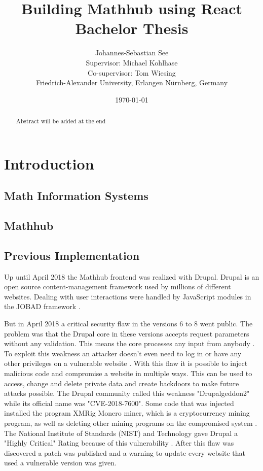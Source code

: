 \documentclass[11pt,a4paper]{article}
\title{Building Mathhub using React\\ \vspace{2 mm} Bachelor Thesis}
\author{Johannes-Sebastian See\\Supervisor: Michael Kohlhase\\Co-supervisor: Tom Wiesing\\Friedrich-Alexander University, Erlangen Nürnberg, Germany}
\date{\today}
\begin{document}
\begin{titlepage}
\maketitle
\begin{abstract}
Abstract will be added at the end
\end{abstract}

\end{titlepage}

\tableofcontents
\section{Introduction}
\subsection{Math Information Systems}
\subsection{Mathhub}
\subsection{Previous Implementation}
	Up until April 2018 the Mathhub frontend was realized with Drupal. Drupal is an open source content-management framework used by millions of different websites.
Dealing with user interactions were handled by JavaScript modules in the JOBAD framework \cite{comp}.
	
But in April 2018 a critical security flaw in the versions 6 to 8 went public. The problem was that the Drupal core in these versions accepts request parameters without any validation.
This means the core processes any input from anybody \cite{zdnet}.
To exploit this weakness an attacker doesn't even need to log in or have any other privileges on a vulnerable website \cite{register}.
With this flaw it is possible to inject malicious code and compromise a website in multiple ways. This can be used to access, change and delete private data and create backdoors to make future attacks possible. The Drupal community called this weakness "Drupalgeddon2" while its official name was "CVE-2018-7600". Some code that was injected installed the program XMRig Monero miner, which is a cryptocurrency mining program, as well as deleting other mining programs on the compromised system \cite{hacker}.
The National Institute of Standards (NIST) and Technology gave Drupal a "Highly Critical" Rating because of this vulnerability \cite{nist}.
 After this flaw was discovered a patch was published and a warning to update every website that used a vulnerable version was given.
	
\end{document}
